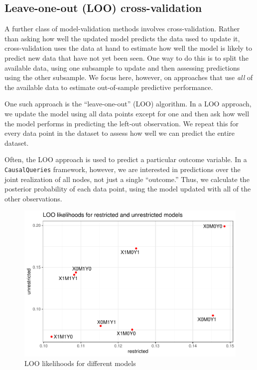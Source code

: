 \documentclass[
  12pt,
]{book}
\begin{document}
\hypertarget{leave-one-out-loo-cross-validation}{%
\subsection{Leave-one-out (LOO) cross-validation}\label{leave-one-out-loo-cross-validation}}

A further class of model-validation methods involves cross-validation. Rather than asking how well the updated model predicts the data used to update it, cross-validation uses the data at hand to estimate how well the model is likely to predict new data that have not yet been seen. One way to do this is to split the available data, using one subsample to update and then assessing predictions using the other subsample. We focus here, however, on approaches that use \emph{all} of the available data to estimate out-of-sample predictive performance.

One such approach is the ``leave-one-out'' (LOO) algorithm. In a LOO approach, we update the model using all data points except for one and then ask how well the model performs in predicting the left-out observation. We repeat this for every data point in the dataset to assess how well we can predict the entire dataset.

Often, the LOO approach is used to predict a particular outcome variable. In a \texttt{CausalQueries} framework, however, we are interested in predictions over the joint realization of all nodes, not just a single ``outcome.'' Thus, we calculate the posterior probability of each data point, using the model updated with all of the other observations.

\begin{figure}
\centering
\includegraphics{ii_files/figure-latex/loolik1-1.pdf}
\caption{\label{fig:loolik1}LOO likelihoods for different models}
\end{figure}
\end{document}
